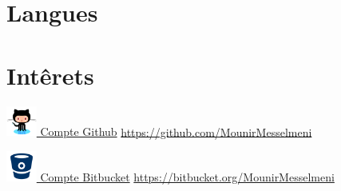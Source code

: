 \documentclass[11pt,a4paper,sans]{moderncv} %
\begin{document}
\section{Langues}



\section{Intêrets}

\renewcommand{\listitemsymbol}{-~} %


\href{https://github.com/MounirMesselmeni}{\includegraphics[width=1cm,height=1cm]{pictures/github.png}
Compte Github}
\url{https://github.com/MounirMesselmeni}

\href{https://bitbucket.org/MounirMesselmeni}{\includegraphics[width=1cm,height=1cm]{pictures/bitbucket.png}
Compte Bitbucket}
\url{https://bitbucket.org/MounirMesselmeni}
\end{document}

